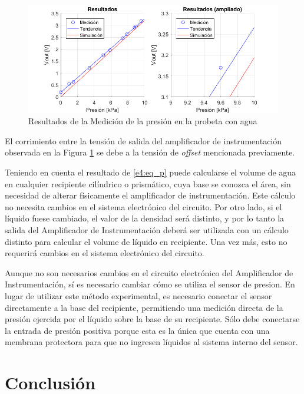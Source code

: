 \begin{figure}
\begin{center}
\includegraphics[scale=0.6]{../Ex4/Informe//res/medysim.png}
\caption{Resultados de la Medición de la presión en la probeta con agua}
\label{e4:fig_p}
\end{center}
\end{figure}

El corrimiento entre la tensión de salida del amplificador de instrumentación observada en la Figura \ref{e4:fig_p} se debe a la tensión de \textit{offset} mencionada previamente.

Teniendo en cuenta el resultado de \eqref{e4:eq_p} puede calcularse el volume de agua en cualquier recipiente cilíndrico o prismático, cuya base se conozca el área, sin necesidad de alterar físicamente el amplificador de instrumentación. Este cálculo no necesita cambios en el sistema electrónico del circuito. Por otro lado, si el líquido fuese cambiado, el valor de la densidad será distinto, y por lo tanto la salida del Amplificador de Instrumentación deberá ser utilizada con un cálculo distinto para calcular el volume de líquido en recipiente. Una vez más, esto no requerirá cambios en el sistema electrónico del circuito.

Aunque no son necesarios cambios en el circuito electrónico del Amplificador de Instrumentación, sí es necesario cambiar cómo se utiliza el sensor de presion. En lugar de utilizar este método experimental, es necesario conectar el sensor directamente a la base del recipiente, permitiendo una medición directa de la presión ejercida por el líquido sobre la base de su recipiente. Sólo debe conectarse la entrada de presión positiva porque esta es la única que cuenta con una membrana protectora para que no ingresen líquidos al sistema interno del sensor.

\section{Conclusión}

